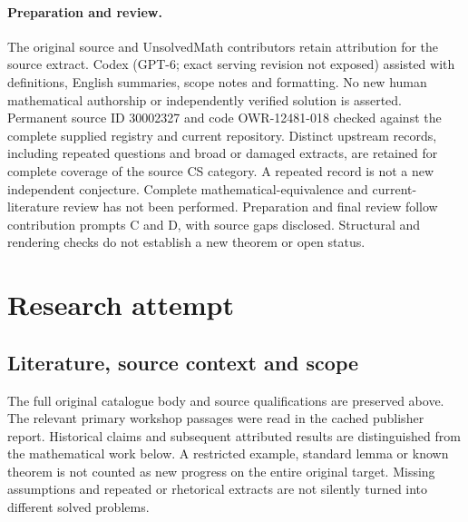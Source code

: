 \documentclass[11pt]{article}
\begin{document}
\paragraph{Preparation and review.}
The original source and UnsolvedMath contributors retain attribution for the source extract. Codex (GPT-6; exact serving revision not exposed) assisted with definitions, English summaries, scope notes and formatting. No new human mathematical authorship or independently verified solution is asserted. Permanent source ID 30002327 and code OWR-12481-018 checked against the complete supplied registry and current repository. Distinct upstream records, including repeated questions and broad or damaged extracts, are retained for complete coverage of the source CS category. A repeated record is not a new independent conjecture. Complete mathematical-equivalence and current-literature review has not been performed. Preparation and final review follow contribution prompts C and D, with source gaps disclosed. Structural and rendering checks do not establish a new theorem or open status.
\label{end:30002327}

\section{Research attempt}
\subsection{Literature, source context and scope}
The full original catalogue body and source qualifications are preserved above. The relevant primary workshop passages were read in the cached publisher report. Historical claims and subsequent attributed results are distinguished from the mathematical work below. A restricted example, standard lemma or known theorem is not counted as new progress on the entire original target. Missing assumptions and repeated or rhetorical extracts are not silently turned into different solved problems.
\end{document}
